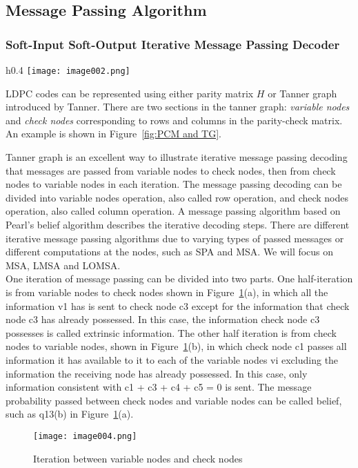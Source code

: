 \subsection{Message Passing Algorithm}
\subsubsection{Soft-Input Soft-Output Iterative Message Passing Decoder}
\begin{wrapfigure}{h}{0.4\textwidth}
    \centering
    \texttt{[image: image002.png]}
    \caption{Parity Check Matrix and Tanner Graph}
    \label{fig:PCM and TG}
\end{wrapfigure}
LDPC codes can be represented using either parity matrix $H$ or Tanner graph introduced by Tanner. There are two sections in the tanner graph:
\textit{variable nodes} and \textit{check nodes} corresponding to rows and columns in the parity-check matrix. An example is shown in Figure~\ref{fig:PCM and TG}.

Tanner graph is an excellent way to illustrate iterative message passing decoding that messages are passed from variable nodes to check nodes, then from check nodes to variable nodes in each iteration. The message passing decoding can be divided into variable nodes operation, also called row operation, and check nodes operation, also called column operation. A message passing algorithm based on Pearl's belief algorithm describes the iterative decoding steps. There are different iterative message passing algorithms due to varying types of passed messages or different computations at the nodes, such as SPA and MSA. We will focus on MSA, LMSA and LOMSA. \\
One iteration of message passing can be divided into two parts.
One half-iteration is from variable nodes to check nodes shown in Figure~\ref{fig:variable and check nodes}(a),
in which all the information v1 has is sent to check node c3 except for the information
that check node c3 has already possessed. In this case, the information check node
c3 possesses is called extrinsic information. The other half iteration is from check
nodes to variable nodes, shown in Figure~\ref{fig:variable and check nodes}(b), in which check node c1 passes all
information it has available to it to each of the variable nodes vi excluding
the information the receiving node has already possessed. In this case, only information
consistent with c1 + c3 + c4 + c5 = 0 is sent. The message probability passed between
check nodes and variable nodes can be called belief, such as q13(b) in Figure~\ref{fig:variable and check nodes}(a).
\begin{figure}[ht]
    \centering
    \texttt{[image: image004.png]}
    \caption{Iteration between variable nodes and check nodes}
    \label{fig:variable and check nodes}
\end{figure}

